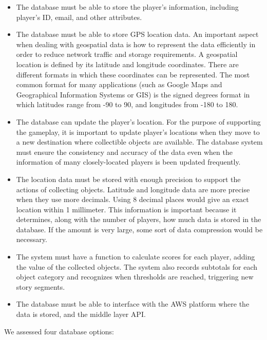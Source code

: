 \documentclass[conference]{IEEEtran}
\begin{document}
\begin{itemize}

\item The database must be able to store the player’s information, including player's ID, email, and other attributes.
\item The database must be able to store GPS location data. An important aspect when dealing with geospatial data is how to represent the data efficiently in order to reduce network traffic and storage requirements. A geospatial location is defined by its latitude and longitude coordinates. There are different formats in which these coordinates can be represented. The most common format for many applications (such as Google Maps and Geographical Information Systems or GIS) is the signed degrees format in which latitudes range from -90 to 90, and longitudes from -180 to 180.
\item The database can update the player's location. For the purpose of supporting the gameplay, it is important to update player’s locations when they move to a new destination where collectible objects are available. The database system must ensure the consistency and accuracy of the data even when the information of many closely-located players is been updated frequently. 
\item The location data must be stored with enough precision to support the actions of collecting objects. Latitude and longitude data are more precise when they use more decimals. Using 8 decimal places would give an exact location within 1 millimeter. This information is important because it determines, along with the number of players, how much data is stored in the database. If the amount is very large, some sort of data compression would be necessary.
\item The system must have a function to calculate scores for each player, adding the value of the collected objects. The system also records subtotals for each object category and recognizes when thresholds are reached, triggering new story segments.
\item The database must be able to interface with the AWS platform where the data is stored, and the middle layer API.

\end{itemize}

We assessed four database options:
\end{document}

